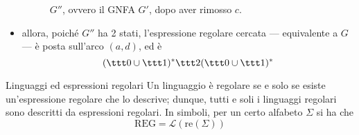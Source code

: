 \documentclass[a4paper, 12pt]{report}
\begin{document}
\begin{example}
\begin{itemize}
\begin{figure}[H]
                     \caption{$G''$, ovvero il GNFA $G'$, dopo aver rimosso $c$.}
                \end{figure}

            \item allora, poiché $G''$ ha 2 stati, l'espressione regolare cercata --- equivalente a $G$ --- è posta sull'arco $(a,d)$, ed è $$(\ttt 0 \cup \ttt 1)^* \ttt 2 (\ttt 0 \cup \ttt 1)^*$$
        \end{itemize}
    \end{example}

    \begin{framedthm}[label={ling expr reg}]{Linguaggi ed espressioni regolari}
        Un linguaggio è regolare se e solo se esiste un'espressione regolare che lo descrive; dunque, tutti e soli i linguaggi regolari sono descritti da espressioni regolari. In simboli, per un certo alfabeto $\Sigma$ si ha che $$\mathrm{REG} = \mathcal{L}(\mathrm{re}(\Sigma))$$
    \end{framedthm}
\end{document}
